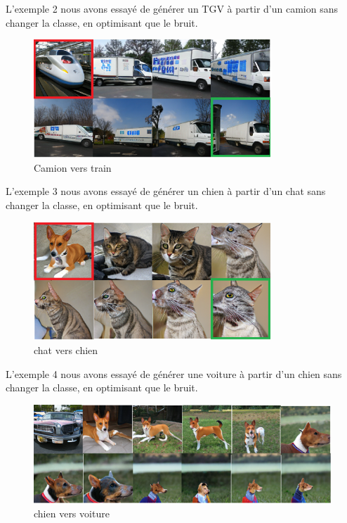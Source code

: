 L'exemple 2 nous avons essayé de générer un TGV à partir d'un camion sans changer la classe, en optimisant que le bruit.
\begin{figure}[H] 
	\centering 
	\includegraphics[width=0.8\textwidth]{./resources/img/car2train_0.png} %
	\caption{Camion vers train } %
\end{figure}

L'exemple 3 nous avons essayé de générer un chien à partir d'un chat sans changer la classe, en optimisant que le bruit.
\begin{figure}[H] 
	\centering 
	\includegraphics[width=0.8\textwidth]{./resources/img/cat2dog_0.png} %
	\caption{chat vers chien} %
\end{figure}

L'exemple 4 nous avons essayé de générer une voiture à partir d'un chien sans changer la classe, en optimisant que le bruit.
\begin{figure}[H] 
	\centering 
	\includegraphics[width=1.0\textwidth]{./resources/img/dog2car_0.png} %
	\caption{chien vers voiture} %
\end{figure}

